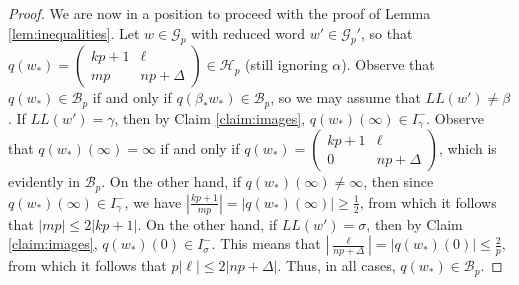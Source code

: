 \documentclass[10pt,a4paper]{amsart}
\begin{document}
\begin{proof}
We are now in a position to proceed with the proof of Lemma \ref{lem:inequalities}. Let $w \in \mathcal{G}_p$ with reduced word $w' \in \mathcal{G}_p'$, so that $q(w_*) = \begin{pmatrix} kp + 1 & \ell \\ mp & np + \Delta \end{pmatrix} \in \mathcal{H}_p$ (still ignoring $\alpha$). Observe that $q(w_*) \in \mathcal{B}_p$ if and only if $q(\beta_* w_*) \in \mathcal{B}_p$, so we may assume that $LL(w') \neq \beta$. If $LL(w') = \gamma$, then by Claim \ref{claim:images}, $q(w_*)(\infty) \in I_\gamma^-$. Observe that $q(w_*)(\infty) = \infty$ if and only if $q(w_*) = \begin{pmatrix} kp + 1 & \ell \\ 0 & np + \Delta \end{pmatrix}$, which is evidently in $\mathcal{B}_p$. On the other hand, if $q(w_*)(\infty) \neq \infty$, then since $q(w_*)(\infty) \in I_\gamma^-$, we have $|\frac{kp+1}{mp} | = |q(w_*)(\infty)| \geq \frac{1}{2}$, from which it follows that $|mp| \leq 2|kp+1|$. On the other hand, if $LL(w')  = \sigma$, then by Claim \ref{claim:images}, $q(w_*)(0) \in I_\sigma^-$. This means that $|\frac{\ell}{np+\Delta}| = |q(w_*)(0)| \leq \frac{2}{p}$, from which it follows that $p|\ell | \leq 2|np+\Delta|$. Thus, in all cases, $q(w_*) \in \mathcal{B}_p$.
\end{proof}
\end{document}
